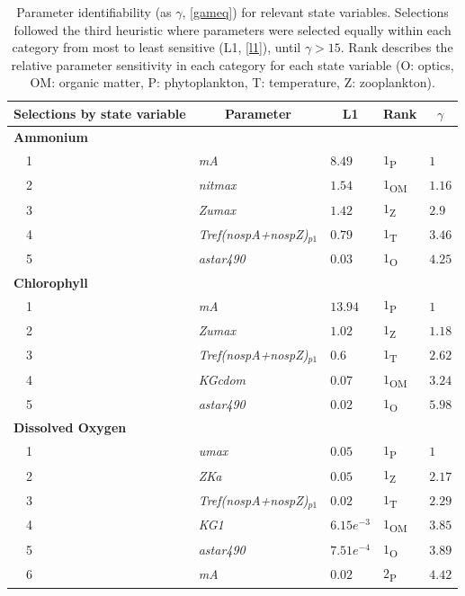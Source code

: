 \documentclass[review]{elsarticle}\usepackage[]{graphicx}\usepackage[]{color}
\begin{document}
\begin{table}[!tbp]
{\scriptsize
\caption{Parameter identifiability (as $\gamma$, \cref{gameq}) for relevant state variables.  Selections followed the third heuristic where parameters were selected equally within each category from most to least sensitive (L1, \cref{l1}), until $\gamma > 15$.  Rank describes the relative parameter sensitivity in each category for each state variable (O: optics, OM: organic matter, P: phytoplankton, T: temperature, Z: zooplankton).\label{tab:heurist3}} 
\begin{center}
\begin{tabular}{lllll}
\hline\hline
\multicolumn{1}{l}{Selections by state variable}&\multicolumn{1}{c}{Parameter}&\multicolumn{1}{c}{L1}&\multicolumn{1}{c}{Rank}&\multicolumn{1}{c}{$\gamma$}\tabularnewline
\hline
{\bfseries Ammonium}&&&&\tabularnewline
~~1&\scriptsize{\textit{mA}}&$8.49$&$1$\textsubscript{P}&$1$\tabularnewline
~~2&\scriptsize{\textit{nitmax}}&$1.54$&$1$\textsubscript{OM}&$1.16$\tabularnewline
~~3&\scriptsize{\textit{Zumax}}&$1.42$&$1$\textsubscript{Z}&$2.9$\tabularnewline
~~4&\scriptsize{\textit{Tref(nospA+nospZ)$_{p1}$}}&$0.79$&$1$\textsubscript{T}&$3.46$\tabularnewline
~~5&\scriptsize{\textit{astar490}}&$0.03$&$1$\textsubscript{O}&$4.25$\tabularnewline
\hline
{\bfseries Chlorophyll}&&&&\tabularnewline
~~1&\scriptsize{\textit{mA}}&$13.94$&$1$\textsubscript{P}&$1$\tabularnewline
~~2&\scriptsize{\textit{Zumax}}&$1.02$&$1$\textsubscript{Z}&$1.18$\tabularnewline
~~3&\scriptsize{\textit{Tref(nospA+nospZ)$_{p1}$}}&$0.6$&$1$\textsubscript{T}&$2.62$\tabularnewline
~~4&\scriptsize{\textit{KGcdom}}&$0.07$&$1$\textsubscript{OM}&$3.24$\tabularnewline
~~5&\scriptsize{\textit{astar490}}&$0.02$&$1$\textsubscript{O}&$5.98$\tabularnewline
\hline
{\bfseries Dissolved Oxygen}&&&&\tabularnewline
~~1&\scriptsize{\textit{umax}}&$0.05$&$1$\textsubscript{P}&$1$\tabularnewline
~~2&\scriptsize{\textit{ZKa}}&$0.05$&$1$\textsubscript{Z}&$2.17$\tabularnewline
~~3&\scriptsize{\textit{Tref(nospA+nospZ)$_{p1}$}}&$0.02$&$1$\textsubscript{T}&$2.29$\tabularnewline
~~4&\scriptsize{\textit{KG1}}&$6.15e^{-3}$&$1$\textsubscript{OM}&$3.85$\tabularnewline
~~5&\scriptsize{\textit{astar490}}&$7.51e^{-4}$&$1$\textsubscript{O}&$3.89$\tabularnewline
~~6&\scriptsize{\textit{mA}}&$0.02$&$2$\textsubscript{P}&$4.42$\tabularnewline

\end{tabular}
\end{center}}
\end{table}
\end{document}
